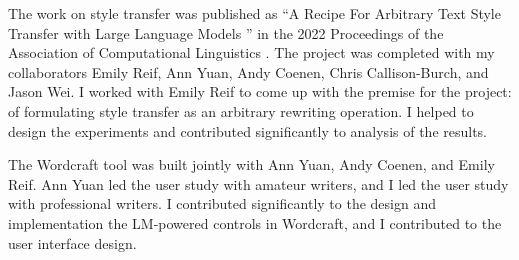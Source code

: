 The work on style transfer was published as ``A Recipe For Arbitrary Text Style Transfer with Large Language Models
'' in the 2022 Proceedings of the Association of Computational Linguistics \citep{reif2021recipe}.
The project was completed with my collaborators Emily Reif, Ann Yuan, Andy Coenen, Chris Callison-Burch, and Jason Wei.
I worked with Emily Reif to come up with the premise for the project: of formulating style transfer as an arbitrary rewriting operation.
I helped to design the experiments and contributed significantly to analysis of the results.

The Wordcraft tool was built jointly with Ann Yuan, Andy Coenen, and Emily Reif.
Ann Yuan led the user study with amateur writers, and I led the user study with professional writers.
I contributed significantly to the design and implementation the LM-powered controls in Wordcraft, and I contributed to the user interface design.